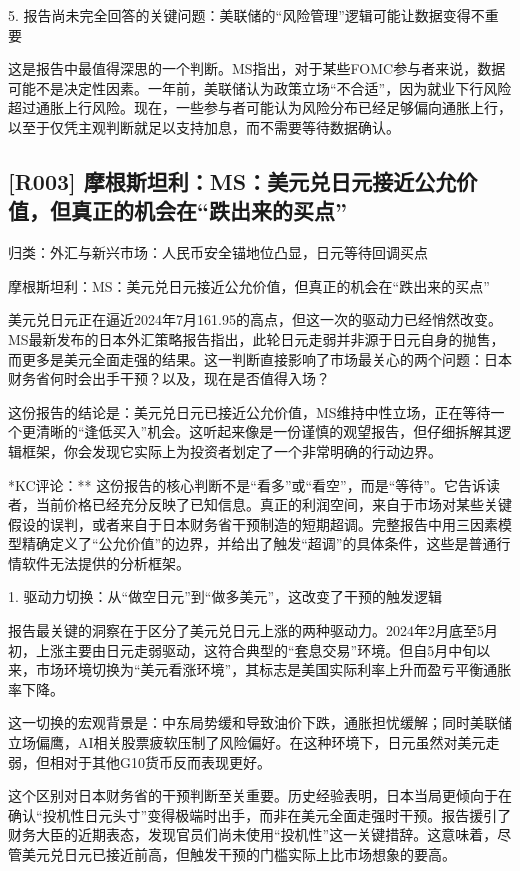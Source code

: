 \documentclass[11pt]{ctexart}
\begin{document}
5. 报告尚未完全回答的关键问题：美联储的“风险管理”逻辑可能让数据变得不重要

这是报告中最值得深思的一个判断。MS指出，对于某些FOMC参与者来说，数据可能不是决定性因素。一年前，美联储认为政策立场“不合适”，因为就业下行风险超过通胀上行风险。现在，一些参与者可能认为风险分布已经足够偏向通胀上行，以至于仅凭主观判断就足以支持加息，而不需要等待数据确认。

\subsection{[R003] 摩根斯坦利：MS：美元兑日元接近公允价值，但真正的机会在“跌出来的买点”}
{\small\color{refgray}归类：外汇与新兴市场：人民币安全锚地位凸显，日元等待回调买点}

摩根斯坦利：MS：美元兑日元接近公允价值，但真正的机会在“跌出来的买点”

美元兑日元正在逼近2024年7月161.95的高点，但这一次的驱动力已经悄然改变。MS最新发布的日本外汇策略报告指出，此轮日元走弱并非源于日元自身的抛售，而更多是美元全面走强的结果。这一判断直接影响了市场最关心的两个问题：日本财务省何时会出手干预？以及，现在是否值得入场？

这份报告的结论是：美元兑日元已接近公允价值，MS维持中性立场，正在等待一个更清晰的“逢低买入”机会。这听起来像是一份谨慎的观望报告，但仔细拆解其逻辑框架，你会发现它实际上为投资者划定了一个非常明确的行动边界。

*KC评论：** 这份报告的核心判断不是“看多”或“看空”，而是“等待”。它告诉读者，当前价格已经充分反映了已知信息。真正的利润空间，来自于市场对某些关键假设的误判，或者来自于日本财务省干预制造的短期超调。完整报告中用三因素模型精确定义了“公允价值”的边界，并给出了触发“超调”的具体条件，这些是普通行情软件无法提供的分析框架。

1. 驱动力切换：从“做空日元”到“做多美元”，这改变了干预的触发逻辑

报告最关键的洞察在于区分了美元兑日元上涨的两种驱动力。2024年2月底至5月初，上涨主要由日元走弱驱动，这符合典型的“套息交易”环境。但自5月中旬以来，市场环境切换为“美元看涨环境”，其标志是美国实际利率上升而盈亏平衡通胀率下降。

这一切换的宏观背景是：中东局势缓和导致油价下跌，通胀担忧缓解；同时美联储立场偏鹰，AI相关股票疲软压制了风险偏好。在这种环境下，日元虽然对美元走弱，但相对于其他G10货币反而表现更好。

这个区别对日本财务省的干预判断至关重要。历史经验表明，日本当局更倾向于在确认“投机性日元头寸”变得极端时出手，而非在美元全面走强时干预。报告援引了财务大臣的近期表态，发现官员们尚未使用“投机性”这一关键措辞。这意味着，尽管美元兑日元已接近前高，但触发干预的门槛实际上比市场想象的要高。
\end{document}
